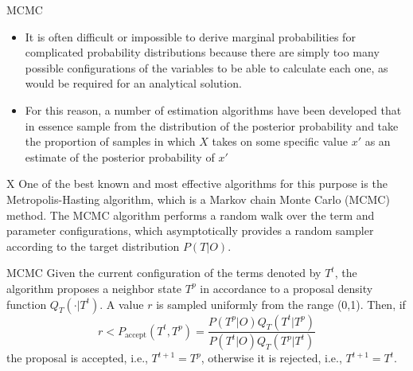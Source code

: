 \documentclass{beamer}
\begin{document}
\begin{frame}{MCMC}
 \begin{itemize}
  \item It is often difficult or
impossible to derive marginal probabilities for complicated
probability distributions because there are simply too many possible
configurations of the variables to be able to calculate each one, as
would be required for an analytical solution. 
\item For this reason, a
number of estimation algorithms have been developed that in essence
sample from the distribution of the posterior probability and take the
proportion of samples in which $X$ takes on some specific value
$x'$ as an estimate of the posterior probability of $x'$  
 \end{itemize}
\begin{mybluebox}{X}
 One of the best known and most effective algorithms for this purpose
is the Metropolis-Hasting algorithm, which is a Markov chain Monte
Carlo (MCMC) method. The
MCMC algorithm performs a random walk over the term and parameter
configurations, which asymptotically provides a random sampler
according to the target distribution $P(T|O)$.
\end{mybluebox}
\end{frame}
\begin{frame}{MCMC}
 Given the current configuration of the terms denoted by $T^t$, the algorithm
proposes a neighbor state $T^p$ in accordance to a proposal density function
$Q_T(\cdot|T^t)$. A value $r$ is sampled uniformly from the range (0,1). Then,
if
\begin{equation}
 r < P_{\text{accept}}(T^t,T^p) = 
 \frac{P(T^{p}|O)Q_T(T^{t}|T^{p})}{P(T^{t}|O)Q_T(T^{p}|T^t)}
 \label{eqn:acceptance}
\end{equation}
the proposal is accepted, i.e., $T^{t+1} = T^p$, otherwise it is rejected,
i.e., $T^{t+1} = T^t$.
\end{frame}
\end{document}
